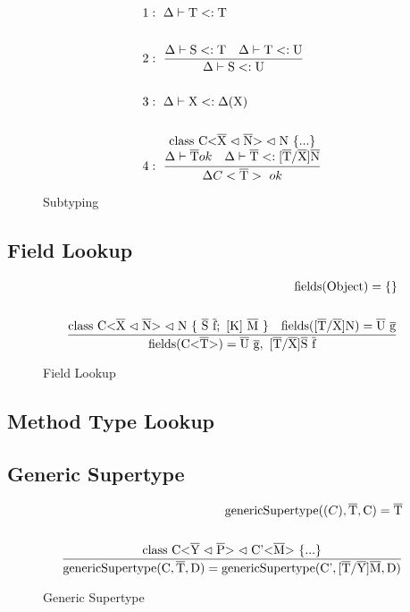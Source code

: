 \begin{figure}[H]
    \begin{align*}
1&: \ \Delta \vdash \text{T} <: \text{T}
\\
\\
2&: \ \frac{\Delta \vdash \text{S} <: \text{T} \quad \Delta \vdash \text{T} <: \text{U}}{\Delta \vdash \text{S} <: \text{U}}
\\
\\
3&: \ \Delta \vdash \text{X} <: \Delta(\text{X})
\\
\\
4&: \ \frac{
    \begin{matrix}
        \text{class C<} \overline{\text{X}} \vartriangleleft \overline{\text{N}} \text{>} \vartriangleleft \text{N} \ \{...\} \\
        \Delta \vdash \overline{\text{T}} ok \quad \Delta \vdash \overline{\text{T}} <: \text{[}\overline{\text{T}}/\overline{\text{X}}\text{]}\overline{\text{N}}
    \end{matrix}}
    {\Delta C<\overline{\text{T}}> \ ok}
    \end{align*}
    \caption{Subtyping}
    \label{subtyping}
\end{figure}


\subsection{Field Lookup}

\begin{figure}[H]
    \begin{align*}
        \text{fields}(\text{Object}) = \{\}\\
        \\
        \frac{\class{S}{f} \quad \text{fields}(\tsxsn{T}{X}{N}) = \ot{U} \ \ot{g} }{\text{fields}(\nvt{C}{T}) = \ot{U} \ \ot{g}, \ \tsxsns{T}{X}{S} \ \ot{f}}
    \end{align*}
    \caption{Field Lookup}
    \label{field_lookup_function}
\end{figure}

\subsection{Method Type Lookup}

\subsection{Generic Supertype}

\begin{figure}[H]
    \begin{align*}
        \text{genericSupertype} (\text(C), \overline{\text{T}}, \text{C} ) = \overline{\text{T}}\\
        \\
        \frac{ \text{class} \ \text{C} \text{<} \overline{\text{Y}} \vartriangleleft \overline{\text{P}} \text{>} \vartriangleleft \text{C'<}\overline{\text{M}}\text{>} \ \{ ... \} }{ \text{genericSupertype} ( \text{C}, \overline{\text{T}}, \text{D} ) = \text{genericSupertype} ( \text{C'}, \text{[}\overline{\text{T}}/\overline{\text{Y}}\text{]}\overline{\text{M}}, \text{D} ) }
    \end{align*}
    \caption{Generic Supertype}
    \label{generic_supertype}
\end{figure}


